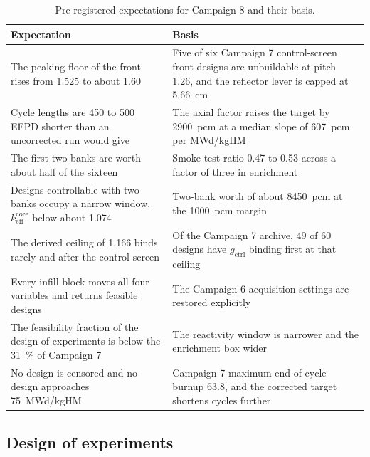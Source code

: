\begin{table}[htbp]
  \centering
  \small
  \caption{Pre-registered expectations for Campaign 8 and their basis.}
  \label{tab:c8-hypotheses}
  \begin{tabularx}{\textwidth}{@{}>{\raggedright\arraybackslash}X>{\raggedright\arraybackslash}X@{}}
    \toprule
    Expectation & Basis \\
    \midrule
    The peaking floor of the front rises from 1.525 to about 1.60
      & Five of six Campaign 7 control-screen front designs are unbuildable at pitch 1.26, and the reflector lever is capped at \SI{5.66}{cm} \\
    Cycle lengths are 450 to 500 EFPD shorter than an uncorrected run would give
      & The axial factor raises the target by \SI{2900}{pcm} at a median slope of \SI{607}{pcm} per MWd/kgHM \\
    The first two banks are worth about half of the sixteen
      & Smoke-test ratio 0.47 to 0.53 across a factor of three in enrichment \\
    Designs controllable with two banks occupy a narrow window, $k_\mathrm{eff}^\mathrm{core}$ below about 1.074
      & Two-bank worth of about \SI{8450}{pcm} at the \SI{1000}{pcm} margin \\
    The derived ceiling of 1.166 binds rarely and after the control screen
      & Of the Campaign 7 archive, 49 of 60 designs have $g_\mathrm{ctrl}$ binding first at that ceiling \\
    Every infill block moves all four variables and returns feasible designs
      & The Campaign 6 acquisition settings are restored explicitly \\
    The feasibility fraction of the design of experiments is below the \SI{31}{\%} of Campaign 7
      & The reactivity window is narrower and the enrichment box wider \\
    No design is censored and no design approaches \SI{75}{MWd/kgHM}
      & Campaign 7 maximum end-of-cycle burnup 63.8, and the corrected target shortens cycles further \\
    \bottomrule
  \end{tabularx}
\end{table}

\subsection{Design of experiments}
\label{sec:res-c8-doe}


